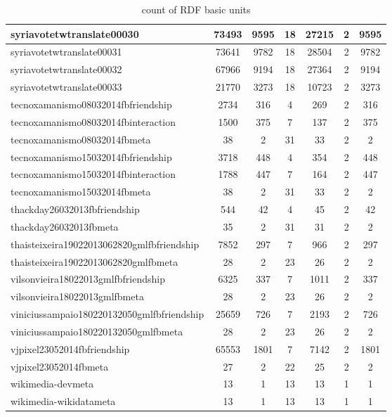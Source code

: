\begin{table*}[h!]
\begin{center}
\begin{tabular}{| l | c | c | c | c | c | c |}
syriavotetwtranslate00030 & 73493  & 9595  & 18  & 27215  & 2  & 9595 \\\hline
syriavotetwtranslate00031 & 73641  & 9782  & 18  & 28504  & 2  & 9782 \\\hline
syriavotetwtranslate00032 & 67966  & 9194  & 18  & 27364  & 2  & 9194 \\\hline
syriavotetwtranslate00033 & 21770  & 3273  & 18  & 10723  & 2  & 3273 \\\hline
tecnoxamanismo08032014fbfriendship & 2734  & 316  & 4  & 269  & 2  & 316 \\\hline
tecnoxamanismo08032014fbinteraction & 1500  & 375  & 7  & 137  & 2  & 375 \\\hline
tecnoxamanismo08032014fbmeta & 38  & 2  & 31  & 33  & 2  & 2 \\\hline
tecnoxamanismo15032014fbfriendship & 3718  & 448  & 4  & 354  & 2  & 448 \\\hline
tecnoxamanismo15032014fbinteraction & 1788  & 447  & 7  & 164  & 2  & 447 \\\hline
tecnoxamanismo15032014fbmeta & 38  & 2  & 31  & 33  & 2  & 2 \\\hline
thackday26032013fbfriendship & 544  & 42  & 4  & 45  & 2  & 42 \\\hline
thackday26032013fbmeta & 35  & 2  & 31  & 31  & 2  & 2 \\\hline
thaisteixeira19022013062820gmlfbfriendship & 7852  & 297  & 7  & 966  & 2  & 297 \\\hline
thaisteixeira19022013062820gmlfbmeta & 28  & 2  & 23  & 26  & 2  & 2 \\\hline
vilsonvieira18022013gmlfbfriendship & 6325  & 337  & 7  & 1011  & 2  & 337 \\\hline
vilsonvieira18022013gmlfbmeta & 28  & 2  & 23  & 26  & 2  & 2 \\\hline
viniciussampaio180220132050gmlfbfriendship & 25659  & 726  & 7  & 2193  & 2  & 726 \\\hline
viniciussampaio180220132050gmlfbmeta & 28  & 2  & 23  & 26  & 2  & 2 \\\hline
vjpixel23052014fbfriendship & 65553  & 1801  & 7  & 7142  & 2  & 1801 \\\hline
vjpixel23052014fbmeta & 27  & 2  & 22  & 25  & 2  & 2 \\\hline
wikimedia-devmeta & 13  & 1  & 13  & 13  & 1  & 1 \\\hline
wikimedia-wikidatameta & 13  & 1  & 13  & 13  & 1  & 1 \\\hline
\end{tabular}
\caption{count of RDF basic units}
\end{center}
\end{table*}
